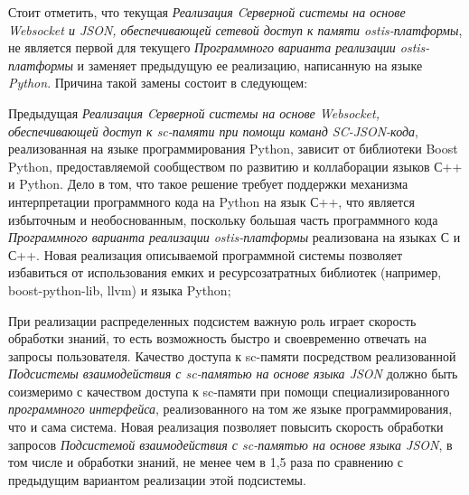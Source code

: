 Стоит отметить, что текущая \textit{Реализация Cерверной системы на основе Websocket и JSON, обеспечивающей сетевой доступ к памяти ostis-платформы}, не является первой для текущего \textit{Программного варианта реализации ostis-платформы} и заменяет предыдущую ее реализацию, написанную на языке \textit{Python}. Причина такой замены состоит в следующем:
\begin{textitemize}
    \item Предыдущая \textit{Реализация Cерверной системы на основе Websocket, обеспечивающей доступ к sc-памяти при помощи команд SC-JSON-кода}, реализованная на языке программирования Python, зависит от библиотеки Boost Python, предоставляемой сообществом по развитию и коллаборации языков С++ и Python. Дело в том, что такое решение требует поддержки механизма интерпретации программного кода на Python на язык С++, что является избыточным и необоснованным, поскольку большая часть программного кода \textit{Программного варианта реализации ostis-платформы} реализована на языках С и С++. Новая реализация описываемой программной системы позволяет избавиться от использования емких и ресурсозатратных библиотек (например, boost-python-lib, llvm) и языка Python;
    \item При реализации распределенных подсистем важную роль играет скорость обработки знаний, то есть возможность быстро и своевременно отвечать на запросы пользователя. Качество доступа к sc-памяти посредством реализованной \textit{Подсистемы взаимодействия с sc-памятью на основе языка JSON} должно быть соизмеримо с качеством доступа к sc-памяти при помощи специализированного \textit{программного интерфейса}, реализованного на том же языке программирования, что и сама система. Новая реализация позволяет повысить скорость обработки запросов \textit{Подсистемой взаимодействия с sc-памятью на основе языка JSON}, в том числе и обработки знаний, не менее чем в 1,5 раза по сравнению с предыдущим вариантом реализации этой подсистемы.
\end{textitemize}

